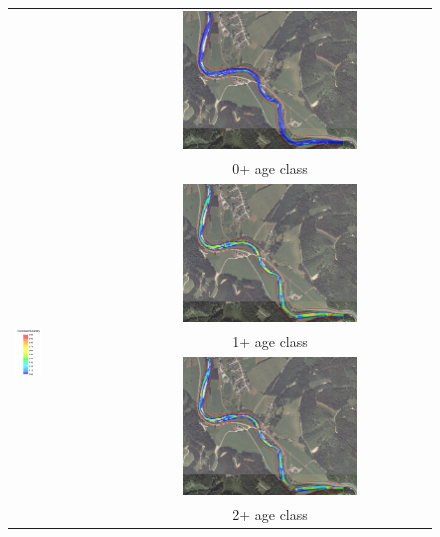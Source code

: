 \centering
\begin{figure}[h!]                                                   	%
	\begin{tabular}{ l  c }
		
		& \includegraphics[width=0.56\textwidth,valign=t]{images/0_0600}\\
		& 0+ age class\\
		\multirow{4}{*}{\includegraphics[width=0.3\textwidth,valign=t]{images/suitability_index}}& \includegraphics[width=0.56\textwidth,valign=t]{images/1_0600}\\
		& 1+ age class\\
		& \includegraphics[width=0.56\textwidth,valign=t]{images/2_0600}\\
		& 2+ age class
		

\end{tabular}
\end{figure}
